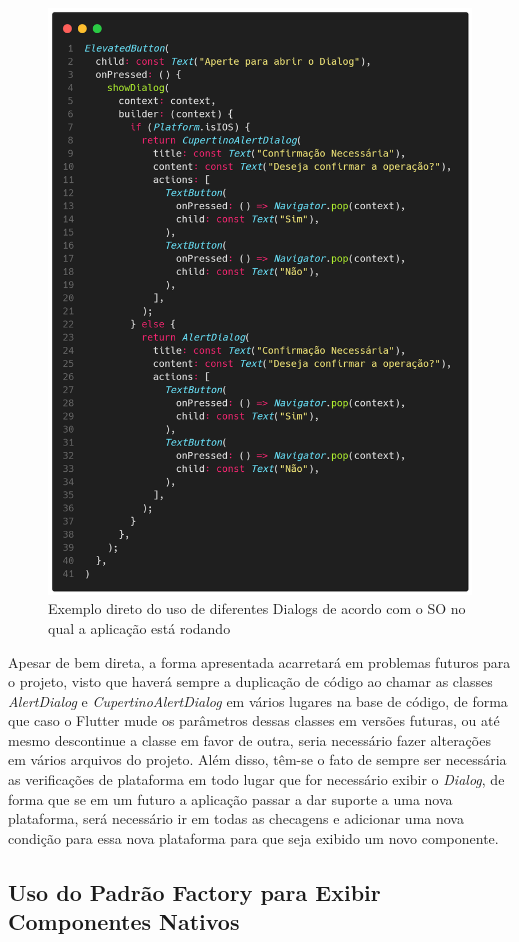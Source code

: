 \documentclass[12pt, %
openright, 
oneside, %
a4paper,    %
brazil]{facom-ufu-abntex2}
\begin{document}
\begin{figure}[ht]
    \centering
    \includegraphics[width=.65\textwidth, trim={0 30 0 100}, clip]{figures/dialog/adhoc_dialog.png}
    \caption{Exemplo direto do uso de diferentes Dialogs de acordo com o SO no qual a aplicação está rodando}
    \label{fig:adhoc_dialog}
\end{figure}

Apesar de bem direta, a forma apresentada acarretará em problemas futuros para o projeto, visto que haverá sempre a duplicação de código ao chamar as classes \textit{AlertDialog} e \textit{CupertinoAlertDialog} em vários lugares na base de código, de forma que caso o Flutter mude os parâmetros dessas classes em versões futuras, ou até mesmo descontinue a classe em favor de outra, seria necessário fazer alterações em vários arquivos do projeto. Além disso, têm-se o fato de sempre ser necessária as verificações de plataforma em todo lugar que for necessário exibir o \textit{Dialog}, de forma que se em um futuro a aplicação passar a dar suporte a uma nova plataforma, será necessário ir em todas as checagens e adicionar uma nova condição para essa nova plataforma para que seja exibido um novo componente.

\subsection{Uso do Padrão Factory para Exibir Componentes Nativos}
\end{document}
